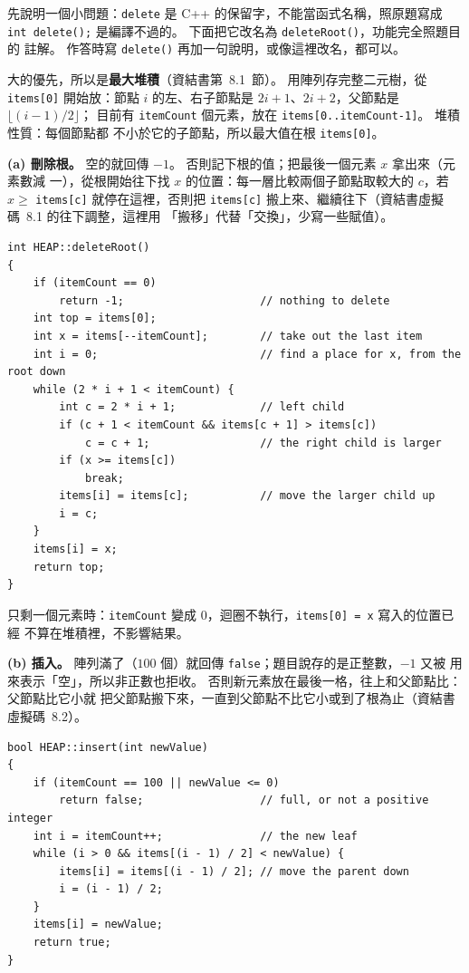 \begin{pastsoln}
先說明一個小問題：\texttt{delete} 是 C++ 的保留字，不能當函式名稱，照原題寫成
\texttt{int delete();} 是編譯不過的。 下面把它改名為 \texttt{deleteRoot()}，功能完全照題目的
註解。 作答時寫 \texttt{delete()} 再加一句說明，或像這裡改名，都可以。

大的優先，所以是\textbf{最大堆積}（資結書第~8.1~節）。 用陣列存完整二元樹，從 \texttt{items[0]}
開始放：節點 $i$ 的左、右子節點是 $2i + 1$、$2i + 2$，父節點是 $\lfloor (i - 1)/2 \rfloor$；
目前有 \texttt{itemCount} 個元素，放在 \texttt{items[0..itemCount-1]}。 堆積性質：每個節點都
不小於它的子節點，所以最大值在根 \texttt{items[0]}。

\textbf{(a) 刪除根。} 空的就回傳 $-1$。 否則記下根的值；把最後一個元素 $x$ 拿出來（元素數減
一），從根開始往下找 $x$ 的位置：每一層比較兩個子節點取較大的 $c$，若 $x \ge$ \texttt{items[c]}
就停在這裡，否則把 \texttt{items[c]} 搬上來、繼續往下（資結書虛擬碼~8.1 的往下調整，這裡用
「搬移」代替「交換」，少寫一些賦值）。

\begin{verbatim}
int HEAP::deleteRoot()
{
    if (itemCount == 0)
        return -1;                     // nothing to delete
    int top = items[0];
    int x = items[--itemCount];        // take out the last item
    int i = 0;                         // find a place for x, from the root down
    while (2 * i + 1 < itemCount) {
        int c = 2 * i + 1;             // left child
        if (c + 1 < itemCount && items[c + 1] > items[c])
            c = c + 1;                 // the right child is larger
        if (x >= items[c])
            break;
        items[i] = items[c];           // move the larger child up
        i = c;
    }
    items[i] = x;
    return top;
}
\end{verbatim}

只剩一個元素時：\texttt{itemCount} 變成 $0$，迴圈不執行，\texttt{items[0] = x} 寫入的位置已經
不算在堆積裡，不影響結果。

\textbf{(b) 插入。} 陣列滿了（$100$ 個）就回傳 \texttt{false}；題目說存的是正整數，$-1$ 又被
用來表示「空」，所以非正數也拒收。 否則新元素放在最後一格，往上和父節點比：父節點比它小就
把父節點搬下來，一直到父節點不比它小或到了根為止（資結書虛擬碼~8.2）。

\begin{verbatim}
bool HEAP::insert(int newValue)
{
    if (itemCount == 100 || newValue <= 0)
        return false;                  // full, or not a positive integer
    int i = itemCount++;               // the new leaf
    while (i > 0 && items[(i - 1) / 2] < newValue) {
        items[i] = items[(i - 1) / 2]; // move the parent down
        i = (i - 1) / 2;
    }
    items[i] = newValue;
    return true;
}
\end{verbatim}


\end{pastsoln}
